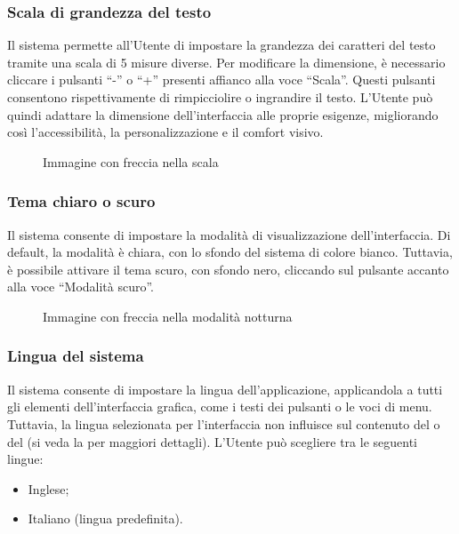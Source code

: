 \subsubsection{Scala di grandezza del testo}

\par Il sistema permette all'Utente di impostare la grandezza dei caratteri del testo tramite una scala di 5 misure diverse. Per modificare la dimensione, è necessario cliccare i pulsanti ``-'' o ``+'' presenti affianco alla voce ``Scala''. Questi pulsanti consentono rispettivamente di rimpicciolire o ingrandire il testo. L'Utente può quindi adattare la dimensione dell'interfaccia alle proprie esigenze, migliorando così l'accessibilità, la personalizzazione e il comfort visivo.

\begin{figure}[H]
  \centering
  \caption{Immagine con freccia nella scala}
\end{figure}

\subsubsection{Tema chiaro o scuro} \label{sec:tema}

\par Il sistema consente di impostare la modalità di visualizzazione dell'interfaccia. Di default, la modalità è chiara, con lo sfondo del sistema di colore bianco. Tuttavia, è possibile attivare il tema scuro, con sfondo nero, cliccando sul pulsante accanto alla voce ``Modalità scuro''.

\begin{figure}[H]
  \centering
  \caption{Immagine con freccia nella modalità notturna}
\end{figure}

\subsubsection{Lingua del sistema} \label{sec:lingua}

\par Il sistema consente di impostare la lingua dell'applicazione, applicandola a tutti gli elementi dell'interfaccia grafica, come i testi dei pulsanti o le voci di menu. Tuttavia, la lingua selezionata per l'interfaccia non influisce sul contenuto del  o del  (si veda la  per maggiori dettagli). L'Utente può scegliere tra le seguenti lingue:
\begin{itemize}
  \item Inglese;
  \item Italiano (lingua predefinita).
\end{itemize}

